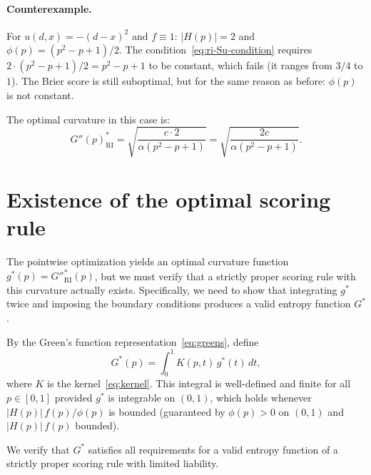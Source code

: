 \documentclass[11pt]{article}
\begin{document}
\paragraph{Counterexample.} For $u(d,x) = -(d-x)^2$ and $f \equiv 1$: $|H(p)| = 2$ and $\phi(p) = (p^2-p+1)/2$. The condition~\eqref{eq:ri-Su-condition} requires $2 \cdot (p^2-p+1)/2 = p^2-p+1$ to be constant, which fails (it ranges from $3/4$ to $1$). The Brier score is still suboptimal, but for the same reason as before: $\phi(p)$ is not constant.

The optimal curvature in this case is:
\[
G''(p)^*_{\mathrm{RI}} = \sqrt{\frac{c \cdot 2}{\alpha(p^2-p+1)}} = \sqrt{\frac{2c}{\alpha(p^2-p+1)}}.
\]


\section{Existence of the optimal scoring rule}

The pointwise optimization yields an optimal curvature function $g^*(p) = G''^*_{\mathrm{RI}}(p)$, but we must verify that a strictly proper scoring rule with this curvature actually exists. Specifically, we need to show that integrating $g^*$ twice and imposing the boundary conditions produces a valid entropy function $G^*$.

By the Green's function representation~\eqref{eq:greens}, define
\[
G^*(p) = \int_0^1 K(p,t)\,g^*(t)\,dt,
\]
where $K$ is the kernel~\eqref{eq:kernel}. This integral is well-defined and finite for all $p \in [0,1]$ provided $g^*$ is integrable on $(0,1)$, which holds whenever $|H(p)|\,f(p)/\phi(p)$ is bounded (guaranteed by $\phi(p) > 0$ on $(0,1)$ and $|H(p)|\,f(p)$ bounded).

We verify that $G^*$ satisfies all requirements for a valid entropy function of a strictly proper scoring rule with limited liability.
\end{document}

